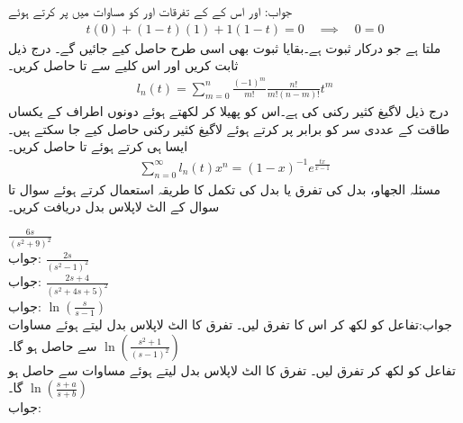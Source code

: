 جواب: اور اس کے کے تفرقات  اور  کو مساوات میں پر کرتے ہوئے
\begin{align*}
t(0)+(1-t)(1)+1(1-t)=0\quad \implies \quad 0=0
\end{align*} 
ملتا ہے جو درکار ثبوت ہے۔بقایا ثبوت بھی اسی طرح حاصل کیے جائیں گے۔
درج ذیل ثابت کریں اور اس کلیے سے  تا  حاصل کریں۔
\begin{align}
l_n(t)=\sum_{m=0}^{n}\frac{(-1)^m}{m!}\frac{n!}{m!(n-m)!}t^m
\end{align}
درج ذیل لاگیغ کثیر رکنی کی  ہے۔اس کو پھیلا کر لکھتے ہوئے دونوں اطراف  کے یکساں طاقت کے عددی سر کو برابر پر کرتے ہوئے لاگیغ کثیر رکنی حاصل کیے جا سکتے ہیں۔ایسا ہی کرتے ہوئے  تا  حاصل کریں۔
\begin{align}
\sum_{n=0}^{\infty}l_n(t)x^n=(1-x)^{-1} e^{\frac{tx}{x-1}}
\end{align} 
مسئلہ الجھاو، بدل کی تفرق یا بدل کی تکمل کا طریقہ استعمال کرتے ہوئے  سوال  تا سوال  کے الٹ لاپلاس بدل دریافت کریں۔

\quad
$\frac{6s}{(s^2+9)^2}$\\
جواب:
\quad
$\frac{2s}{(s^2-1)^2}$\\
جواب:
\quad
$\frac{2s+4}{(s^2+4s+5)^2}$\\
جواب:
\quad
$\ln \left(\frac{s}{s-1}\right)$\\
جواب:تفاعل کو  لکھ کر اس کا تفرق لیں۔ تفرق کا الٹ لاپلاس بدل لیتے ہوئے مساوات  سے  حاصل ہو گا۔
\quad
$\ln\left(\frac{s^2+1}{(s-1)^2}\right)$\\
تفاعل کو  لکھ کر تفرق لیں۔ تفرق کا الٹ لاپلاس بدل لیتے ہوئے مساوات  سے  حاصل ہو گا۔
\quad
$\ln \left(\frac{s+a}{s+b}\right)$\\
جواب:

